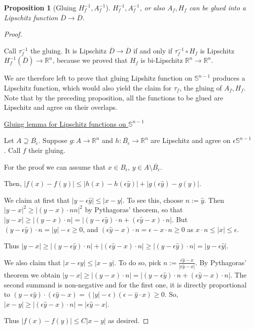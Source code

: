\documentclass[english,a4paper,10pt,oneside]{scrbook}	%
\theoremstyle{break}
\newtheorem{prop}[equation]{Proposition}
\newenvironment{mproof}[1][\proofname]{%
  \begin{proof}[#1]$ $\par\nobreak\ignorespaces
}{%
  \end{proof}
}
\renewcommand*{\proofname}{Proof}
\theoremstyle{remark}
\newcommand{\mR}{\mathbb{R}}
\newcommand{\mS}{\mathbb{S}^{n-1}}
\newcommand{\yh}{\hat{y}}
\newcommand{\eps}{\epsilon}
\begin{document}
\begin{prop}[Gluing $H_f^{-1}, A_f^{-1}$]
\label{prop:gluing}
$H_f^{-1}, A_f^{-1}$, or also $A_f, H_f$ can be glued into a Lipschitz function $\overline{D}\rightarrow\overline{D}$.
\end{prop}
\begin{mproof}

Call $\tau_f^{-1}$ the gluing. It is Lipschitz $\overline{D}\rightarrow\overline{D}$ if and only if $\tau_f^{-1}\circ H_f$ is Lipschitz $H_f^{-1}(\overline{D})\rightarrow\mR^n$, because we proved that $H_f$ is bi-Lipschitz $\mR^n \rightarrow \mR^n$.

We are therefore left to prove that gluing Lipshitz function on $\mS$ produces a Lipschitz function, which would also yield the claim for $\tau_f$, the gluing of $A_f, H_f$. Note that by the preceding proposition, all the functions to be glued are Lipschitz and agree on their overlaps.

\underline{Gluing lemma for Lipschitz functions on $\mS$}

Let $A\supseteq \overline{B_\eps}$. Suppose $g:A\rightarrow\mR^n$ and $h:\overline{B_\eps}\rightarrow\mR^n$ are Lipschitz and agree on $\eps \mS$. Call $f$ their gluing.

For the proof we can assume that $x \in B_\eps$, $y \in A \setminus \overline{B_\eps}$.

Then, $|f(x)-f(y)|\leq |h(x)-h(\eps \yh)|+|g(\eps \yh)-g(y)|$.

We claim at first that $|y-\eps \yh|\leq  |x-y|$. To see this, choose $n:=\yh$. Then $|y-x|^2 \geq |(y-x)\cdot n n|^2$ by Pythagoras' theorem, so that $|y-x|\geq |(y-x)\cdot n| = |(y-\eps \yh)\cdot n + (\eps \yh -x)\cdot n|$. But $(y-\eps \yh)\cdot n=|y|-\eps \geq 0$, and $(\eps \yh -x)\cdot n = \eps - x\cdot n\geq 0 $ as $x\cdot n \leq |x|\leq \eps$.

Thus  $|y-x|\geq |(y-\eps \yh)\cdot n| + |(\eps \yh -x)\cdot n|\geq  |(y-\eps \yh)\cdot n|=|y-\eps \yh|$.

We also claim that $|x-\eps \yh|\leq |x-y|$. To do so, pick $n:=\frac{\eps\yh -x}{|\eps\yh-x|}$. By Pythagoras' theorem we obtain $|y-x|\geq |(y-x)\cdot n|=|(y-\eps \yh)\cdot n +(\eps \yh -x)\cdot n|$. The second summand is non-negative and for the first one, it is directly proportional to $(y-\eps \yh)\cdot(\eps \yh-x)=(|y|-\eps)(\eps-\yh\cdot x)\geq 0$. So, $|x-y|\geq |(\eps \yh -x)\cdot n|=|\eps \yh -x|$.

Thus $ |f(x)-f(y)|\leq C|x-y|$ as desired.


\end{mproof}
\end{document}
